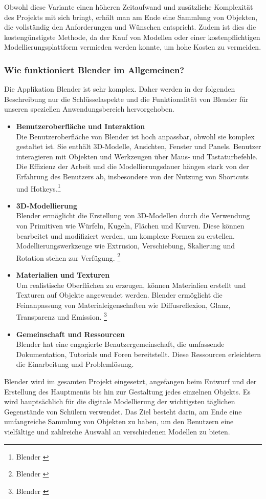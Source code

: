 Obwohl diese Variante einen höheren Zeitaufwand und zusätzliche Komplexität des Projekts mit sich bringt, erhält man
am Ende eine Sammlung von Objekten, die vollständig den Anforderungen und Wünschen entspricht. Zudem ist dies die
kostengünstigste Methode, da der Kauf von Modellen oder einer kostenpflichtigen Modellierungsplattform vermieden werden
konnte, um hohe Kosten zu vermeiden.

\subsubsection{Wie funktioniert Blender im Allgemeinen?}
Die Applikation Blender ist sehr komplex. Daher werden in der folgenden Beschreibung nur die Schlüsselaspekte und die
Funktionalität von Blender für unseren speziellen Anwendungsbereich hervorgehoben.

\begin{itemize}
    \item \textbf{Benutzeroberfläche und Interaktion}\\
    Die Benutzeroberfläche von Blender ist hoch anpassbar, obwohl sie komplex gestaltet ist. Sie enthält 3D-Modelle,
    Ansichten, Fenster und Panels. Benutzer interagieren mit Objekten und Werkzeugen über Maus- und Tastaturbefehle.
    Die Effizienz der Arbeit und die Modellierungsdauer hängen stark von der Erfahrung des Benutzers ab, insbesondere
    von der Nutzung von Shortcuts und Hotkeys.\footnote{Blender \cite{Benutzeroberfläche}}

    \item \textbf{3D-Modellierung}\\
    Blender ermöglicht die Erstellung von 3D-Modellen durch die Verwendung von Primitiven wie Würfeln, Kugeln,
    Flächen und Kurven. Diese können bearbeitet und modifiziert werden, um komplexe Formen zu erstellen.
    Modellierungswerkzeuge wie Extrusion, Verschiebung, Skalierung und Rotation stehen zur Verfügung.
    \footnote{Blender \cite{Toolbar}}

    \item \textbf{Materialien und Texturen}\\
    Um realistische Oberflächen zu erzeugen, können Materialien erstellt und Texturen auf Objekte angewendet werden.
    Blender ermöglicht die Feinanpassung von Materialeigenschaften wie Diffusreflexion, Glanz, Transparenz und Emission.
    \footnote{Blender \cite{Materials}}

    \item \textbf{Gemeinschaft und Ressourcen}\\
    Blender hat eine engagierte Benutzergemeinschaft, die umfassende Dokumentation, Tutorials und Foren
    bereitstellt. Diese Ressourcen erleichtern die Einarbeitung und Problemlösung.
\end{itemize}

Blender wird im gesamten Projekt eingesetzt, angefangen beim Entwurf und der Erstellung des Hauptmenüs bis hin zur
Gestaltung jedes einzelnen Objekts. Es wird hauptsächlich für die digitale Modellierung der wichtigsten täglichen
Gegenstände von Schülern verwendet. Das Ziel besteht darin, am Ende eine umfangreiche Sammlung von Objekten zu haben,
um den Benutzern eine vielfältige und zahlreiche Auswahl an verschiedenen Modellen zu bieten.
